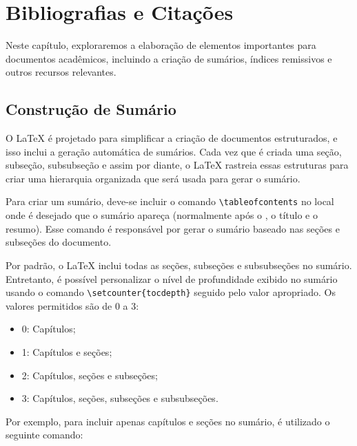 %
%
%
\chapter{Bibliografias e Cita\c c\~oes}
\label{intro} %

Neste capítulo, exploraremos a elaboração de elementos importantes para documentos acadêmicos, incluindo a criação de sumários, índices remissivos e outros recursos relevantes. 

\section{Construção de Sum\'ario}
\label{sec:1}

O \LaTeX{} é projetado para simplificar a criação de documentos estruturados, e isso inclui a geração automática de sumários. Cada vez que \'e criada uma seção, subseção, subsubseção e assim por diante, o \LaTeX{} rastreia essas estruturas para criar uma hierarquia organizada que será usada para gerar o sumário.

\noindent Para criar um sumário, deve-se incluir o comando \verb|\tableofcontents| no local onde \'e desejado que o sumário apareça (normalmente ap\'os o \verb||, o título e o resumo). Esse comando é responsável por gerar o sumário baseado nas seções e subseções do documento.

\noindent Por padrão, o \LaTeX{} inclui todas as seções, subseções e subsubseções no sumário. Entretanto, é possível personalizar o nível de profundidade exibido no sumário usando o comando \verb|\setcounter{tocdepth}| seguido pelo valor apropriado. Os valores permitidos são de 0 a 3:
\begin{itemize}
    \item 0: Capítulos;
    \item 1: Capítulos e seções;
    \item 2: Capítulos, seções e subseções;
    \item 3: Capítulos, seções, subseções e subsubseções.
\end{itemize}
Por exemplo, para incluir apenas capítulos e seções no sumário, \'e utilizado o seguinte comando:

